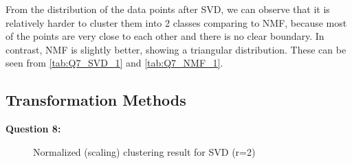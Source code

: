 \documentclass[runningheads]{llncs}
\begin{document}
\begin{table}[h]
\center
\caption{Performance for NMF (r=2)}
\label{tab:Q7_NMF_2}
\end{table}

From the distribution of the data points after SVD, we can observe that it is relatively harder to cluster them into 2 classes comparing to NMF, because most of the points are very close to each other and there is no clear boundary. In contrast, NMF is slightly better, showing a triangular distribution. These can be seen from \ref{tab:Q7_SVD_1} and \ref{tab:Q7_NMF_1}.

\subsection{Transformation Methods}

\textbf{Question 8:}

\begin{figure}
\centering
{}
\caption{Normalized (scaling) clustering result for SVD (r=2)} \label{Q8_SVD_scale}
\end{figure}
\end{document}
